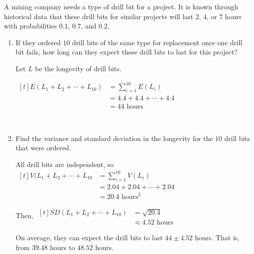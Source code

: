 \begin{example}
    A mining company needs a type of drill bit for a project. It is known through historical data that these drill bits for similar projects will last $2$, $4$, or $7$ hours with probabilities $0.1$, $0.7$, and $0.2$. 

    \begin{enumerate}[label=\alph*)]
        \item If they ordered $10$ drill bits of the same type for replacement once one drill bit fails, how long can they expect these drill bits to last for this project?

        Let $L$ be the longevity of drill bits. 

        $\begin{aligned}[t]
            E(L_1 + L_2 + \cdots + L_{10}) & = \sum_{i=1}^{10} E(L_i)       \\
                                           & = 4.4 + 4.4 + \cdots + 4.4     \\
                                           & = 44 \text{ hours}
        \end{aligned}$

        {~~~}
        
        \item Find the variance and standard deviation in the longevity for the $10$ drill bits that were ordered.

        All drill bits are independent, so $\begin{aligned}[t]
            V(L_1 + L_2 + \cdots + L_{10} & = \sum_{i=1}^{10} V(L_i)      \\
                                          & = 2.04 + 2.04 + \cdots + 2.04 \\
                                          & = 20.4 \text{ hours}^2
        \end{aligned}$

        Then, $\begin{aligned}[t]
            SD(L_1 + L_2 + \cdots + L_{10}) & = \sqrt{20.4}              \\
                                            & \approx 4.52 \text{ hours}
        \end{aligned}$

        On average, they can expect the drill bits to last $44 \pm 4.52$ hours. That is, from $39.48$ hours to $48.52$ hours. 
    \end{enumerate}
\end{example}

